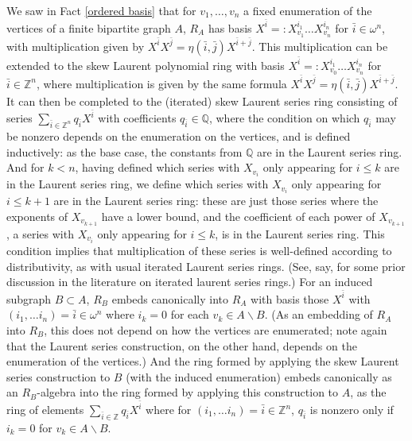 \documentclass{amsart}
\theoremstyle{definition}
\theoremstyle{remark}
\numberwithin{equation}{section}
\begin{document}
We saw in Fact \ref{ordered basis} that for $v_{1}, \ldots, v_{n}$ a fixed enumeration of the vertices of a finite bipartite graph $A$, $R_{A}$ has basis $X^{\bar{i}} =: X_{v_{1}}^{i_{1}} \ldots X_{v_{n}}^{i_{n}}$ for $\bar{i} \in \omega^{n}$, with multiplication given by $X^{\bar{i}}X^{\bar{j}}= \eta(\bar{i}, \bar{j})X^{\bar{i}+\bar{j}}$. This multiplication can be extended to the skew Laurent polynomial ring with basis $X^{\bar{i}} =: X_{v_{0}}^{i_{1}} \ldots X_{v_{n}}^{i_{n}}$ for $\bar{i} \in \mathbb{Z}^{n}$, where multiplication is given by the same formula $X^{\bar{i}}X^{\bar{j}}= \eta(\bar{i}, \bar{j})X^{\bar{i}+\bar{j}}$. It can then be completed  to the (iterated) skew Laurent series ring consisting of series $\sum_{\bar{i} \in \mathbb{Z}^{n}} q_{\bar{i}}X^{\bar{i}}$ with coefficients $q_{\bar{i}} \in \mathbb{Q}$, where the condition on which $q_{\bar{i}}$ may be nonzero depends on the enumeration on the vertices, and is defined inductively: as the base case, the constants from $\mathbb{Q}$ are in the Laurent series ring. And for $k < n$, having defined which series with $X_{v_{i}}$ only appearing for $i \leq k$ are in the Laurent series ring, we define which series with $X_{v_{i}}$ only appearing for $i \leq k+1$ are in the Laurent series ring: these are just those series where the exponents of $X_{v_{k+1}}$ have a lower bound, and the coefficient of each power of $X_{v_{k+1}}$, a series with $X_{v_{i}}$ only appearing for $i \leq k$, is in the Laurent series ring. This condition implies that multiplication of these series is well-defined according to distributivity, as with usual iterated Laurent series rings. (See, say, \cite{Xin2004} for some prior discussion in the literature on iterated laurent series rings.) For an induced subgraph $B \subset A$, $R_{B}$ embeds canonically into $R_{A}$ with basis those $X^{\bar{i}}$ with $(i_{1}, \ldots i_{n}) = \bar{i} \in \omega^{n}$ where $i_{k} =0$ for each $ v_{k} \in A \backslash B$. (As an embedding of $R_A$ into $R_B$, this does not depend on how the vertices are enumerated; note again that the Laurent series construction, on the other hand, depends on the enumeration of the vertices.) And the ring formed by applying the skew Laurent series construction to $B$ (with the induced enumeration) embeds canonically as an $R_{B}$-algebra into the ring formed by applying this construction to $A$, as the ring of elements $\sum_{\bar{i}\in \mathbb{Z}} q_{\bar{i}}X^{\bar{i}}$ where for $(i_{1}, \ldots i_{n}) = \bar{i} \in \mathbb{Z}^{n}$, $q_{\bar{i}}$ is nonzero only if $i_{k} =0$ for $ v_{k} \in A \backslash B$.
\end{document}
